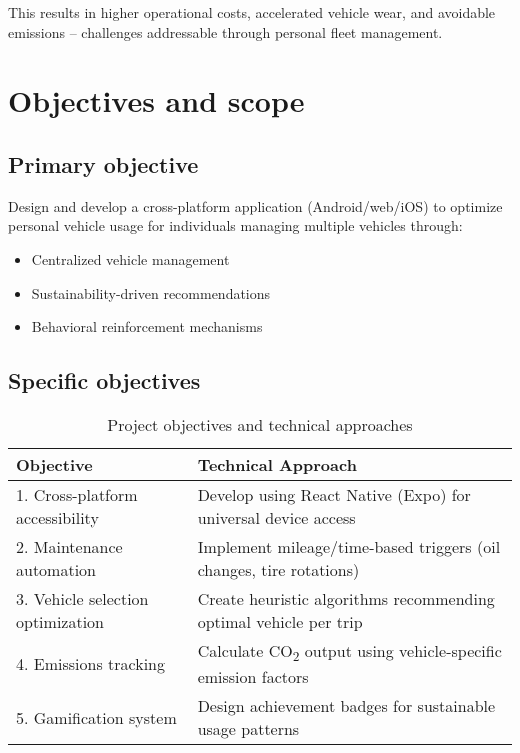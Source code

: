 This results in higher operational costs, accelerated vehicle wear, and avoidable emissions – challenges addressable through personal fleet management.

\section{Objectives and scope}

\subsection{Primary objective}

Design and develop a cross-platform application (Android/web/iOS) to optimize personal vehicle usage for individuals managing multiple vehicles through:

\begin{itemize}
    \item Centralized vehicle management
    
    \item Sustainability-driven recommendations
    
    \item Behavioral reinforcement mechanisms
\end{itemize}

\subsection{Specific objectives}

\begin{table}[h]
    \centering
    \begin{tabular}{@{}p{} p{}@{}}
        \toprule
        \textbf{Objective} & \textbf{Technical Approach} \\ \midrule
        1. Cross-platform accessibility & Develop using React Native (Expo) for universal device access \\
        2. Maintenance automation & Implement mileage/time-based triggers (oil changes, tire rotations) \\
        3. Vehicle selection optimization & Create heuristic algorithms recommending optimal vehicle per trip \\
        4. Emissions tracking & Calculate CO\textsubscript{2} output using vehicle-specific emission factors \\
        5. Gamification system & Design achievement badges for sustainable usage patterns \\ \bottomrule
    \end{tabular}
    \caption{Project objectives and technical approaches}
\end{table}

